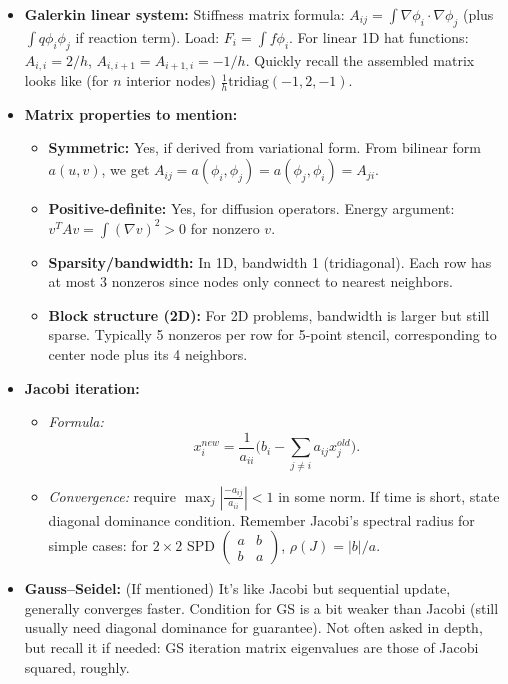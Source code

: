 \documentclass[a4paper,11pt]{article}
\begin{document}
\begin{itemize}[leftmargin=*]
    \item \textbf{Galerkin linear system:} Stiffness matrix formula: $A_{ij} = \int \nabla \phi_i \cdot \nabla \phi_j$ (plus $\int q\phi_i\phi_j$ if reaction term). Load: $F_i=\int f \phi_i$. For linear 1D hat functions: $A_{i,i}=2/h$, $A_{i,i+1}=A_{i+1,i}=-1/h$. Quickly recall the assembled matrix looks like (for $n$ interior nodes) $\frac{1}{h}\mathrm{tridiag}(-1,2,-1)$.

    \item \textbf{Matrix properties to mention:}
          \begin{itemize}
              \item \textbf{Symmetric:} Yes, if derived from variational form. From bilinear form $a(u,v)$, we get $A_{ij}=a(\phi_i,\phi_j)=a(\phi_j,\phi_i)=A_{ji}$.

              \item \textbf{Positive-definite:} Yes, for diffusion operators. Energy argument: $v^T A v = \int (\nabla v)^2 > 0$ for nonzero $v$.

              \item \textbf{Sparsity/bandwidth:} In 1D, bandwidth 1 (tridiagonal). Each row has at most 3 nonzeros since nodes only connect to nearest neighbors.

              \item \textbf{Block structure (2D):} For 2D problems, bandwidth is larger but still sparse. Typically 5 nonzeros per row for 5-point stencil, corresponding to center node plus its 4 neighbors.
          \end{itemize}
    \item \textbf{Jacobi iteration:}
          \begin{itemize}
              \item \emph{Formula:}
                    \[
                        x_i^{new} = \frac{1}{a_{ii}}\Big(b_i - \sum_{j\neq i}a_{ij}x_j^{old}\Big).
                    \]
              \item \emph{Convergence:}
                    require $\max_j |\frac{-a_{ij}}{a_{ii}}| < 1$ in some norm. If time is short, state diagonal dominance condition.
                    Remember Jacobi's spectral radius for simple cases: for $2\times2$ SPD $ \begin{pmatrix}a & b\\ b & a\end{pmatrix}$, $\rho(J) = |b|/a$.
          \end{itemize}
    \item \textbf{Gauss--Seidel:} (If mentioned) It's like Jacobi but sequential update, generally converges faster. Condition for GS is a bit weaker than Jacobi (still usually need diagonal dominance for guarantee). Not often asked in depth, but recall it if needed: GS iteration matrix eigenvalues are those of Jacobi squared, roughly.


\end{itemize}
\end{document}

